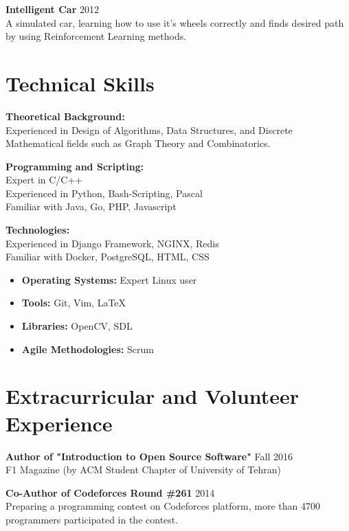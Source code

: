 \documentclass[margin]{res}
\begin{document}
\begin{resume}
    \vspace{5mm}
    {\bf Intelligent Car} \hfill 2012
    \\A simulated car, learning how to use it's wheels correctly and finds desired path by using Reinforcement Learning methods.

\vspace{5mm}

\section{Technical Skills} 
    {\bf Theoretical Background:}
    \\Experienced in Design of Algorithms, Data Structures, and Discrete Mathematical fields such as Graph Theory and Combinatorics.

	{\bf Programming and Scripting:}
	\\Expert in C/C++
	\\Experienced in Python, Bash-Scripting, Pascal
	\\Familiar with Java, Go, PHP, Javascript
	
	{\bf Technologies:}
	\\Experienced in Django Framework, NGINX, Redis
	\\Familiar with Docker, PostgreSQL, HTML, CSS
	
	\vspace{3mm}
	
	\begin{itemize}[leftmargin=0mm]
	    \item[] \textbf{Operating Systems:} Expert Linux user
	    \item[] \textbf{Tools:} Git, Vim, \LaTeX
	    \item[] \textbf{Libraries:} OpenCV, SDL
	    \item[] \textbf{Agile Methodologies:} Scrum
	\end{itemize}

\vspace{5mm}

\section{Extracurricular and Volunteer Experience}
    {\bf Author of "Introduction to Open Source Software"} \hfill Fall 2016
   \\F1 Magazine (by ACM Student Chapter of University of Tehran)

   {\bf Co-Author of Codeforces Round \#261} \hfill 2014
   \\Preparing a programming contest on Codeforces platform, more than 4700 programmers participated in the contest.
   

\end{resume} 
\end{document}
